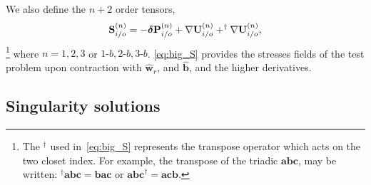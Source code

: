 We also define the $n+2$ order tensors, 
\begin{equation}
    \textbf{S}_{i/o}^{(n)} = 
    - \bm\delta\textbf{P}_{i/o}^{(n)}
    + \grad \textbf{U}_{i/o}^{(n)}
    + ^\dagger\grad \textbf{U}_{i/o}^{(n)},
    \label{eq:big_S}
\end{equation}\footnote{The $^\dagger$ used in~\ref{eq:big_S} represents the transpose operator which acts on the two closet index.
For example, the transpose of the triadic $\textbf{abc}$, may be written:  $^\dagger\textbf{abc} = \textbf{bac}$ or $\textbf{abc}^\dagger = \textbf{acb}$. }
where $n =1,2,3$ or $1\text{-}b,2\text{-}b,3\text{-}b$. 
\ref{eq:big_S} provides the stresses fields of the test problem upon contraction with $\hat{\textbf{w}}_r$, and $\hat{\textbf{b}}$, and the higher derivatives. 

\subsection{Singularity solutions}

